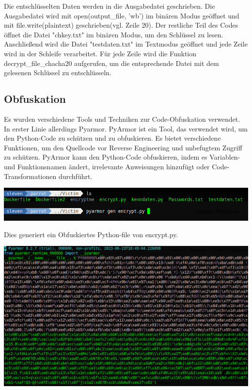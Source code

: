 \documentclass[12pt]{article}
\begin{document}
Die entschlüsselten Daten werden in die Ausgabedatei geschrieben. Die Ausgabedatei wird mit open(output\_file, 'wb') im binären Modus geöffnet und mit file.write(plaintext) geschrieben(vgl. Zeile 20).
Der restliche Teil des Codes öffnet die Datei "chkey.txt" im binären Modus, um den Schlüssel zu lesen. Anschließend wird die Datei "testdaten.txt" im Textmodus geöffnet und jede Zeile wird in der Schleife verarbeitet. Für jede Zeile wird die Funktion decrypt\_file\_chacha20 aufgerufen, um die entsprechende Datei mit dem gelesenen Schlüssel zu entschlüsseln.
\subsection{Obfuskation}
Es wurden verschiedene Tools und Techniken zur Code-Obfuskation verwendet. In erster Linie allerdings Pyarmor. PyArmor ist ein Tool, das verwendet wird, um den Python-Code zu schützen und zu obfuskieren. Es bietet verschiedene Funktionen, um den Quellcode vor Reverse Engineering und unbefugtem Zugriff zu schützen. PyArmor kann den Python-Code obfuskieren, indem es Variablen- und Funktionsnamen ändert, irrelevante Anweisungen hinzufügt oder Code-Transformationen durchführt.
\begin{center}
 \includegraphics[scale=0.4]{pyarmor.png}
\end{center}
Dies generiert ein Obfuskiertes Python-file von encrypt.py.
\newpage

\begin{center}
 \includegraphics[scale=0.4]{obf.png}
\end{center}
\end{document}
